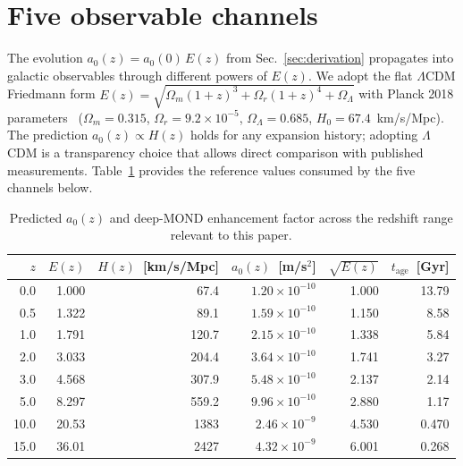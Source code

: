 \documentclass[
    aps,
    prd,
    reprint,
    superscriptaddress,
    nofootinbib,
    floatfix
]{revtex4-2}
\begin{document}
\section{Five observable channels}
\label{sec:channels}

The evolution $a_0(z) = a_0(0)\,E(z)$ from Sec.~\ref{sec:derivation}
propagates into galactic observables through different powers of
$E(z)$. We adopt the flat $\Lambda$CDM Friedmann form
$E(z) = \sqrt{\Omega_m(1+z)^3 + \Omega_r(1+z)^4 + \Omega_\Lambda}$
with Planck 2018 parameters~\cite{Planck2018} ($\Omega_m = 0.315$,
$\Omega_r = 9.2 \times 10^{-5}$, $\Omega_\Lambda = 0.685$,
$H_0 = 67.4$~km/s/Mpc). The prediction $a_0(z) \propto H(z)$ holds for
any expansion history; adopting $\Lambda$CDM is a transparency choice
that allows direct comparison with published measurements.
Table~\ref{tab:cosmology} provides the reference values consumed by
the five channels below.

\begin{table}[tb]
\caption{\label{tab:cosmology}Predicted $a_0(z)$ and deep-MOND
enhancement factor across the redshift range relevant to this paper.}
\begin{ruledtabular}
\begin{tabular}{rrrrrr}
$z$ & $E(z)$ & $H(z)$~[km/s/Mpc] & $a_0(z)$~[m/s$^2$]
    & $\sqrt{E(z)}$ & $t_\text{age}$~[Gyr] \\
\hline
0.0  & 1.000  & 67.4   & $1.20 \times 10^{-10}$ & 1.000 & 13.79 \\
0.5  & 1.322  & 89.1   & $1.59 \times 10^{-10}$ & 1.150 & 8.58  \\
1.0  & 1.791  & 120.7  & $2.15 \times 10^{-10}$ & 1.338 & 5.84  \\
2.0  & 3.033  & 204.4  & $3.64 \times 10^{-10}$ & 1.741 & 3.27  \\
3.0  & 4.568  & 307.9  & $5.48 \times 10^{-10}$ & 2.137 & 2.14  \\
5.0  & 8.297  & 559.2  & $9.96 \times 10^{-10}$ & 2.880 & 1.17  \\
10.0 & 20.53  & 1383   & $2.46 \times 10^{-9}$  & 4.530 & 0.470 \\
15.0 & 36.01  & 2427   & $4.32 \times 10^{-9}$  & 6.001 & 0.268 \\
\end{tabular}
\end{ruledtabular}
\end{table}
\end{document}
